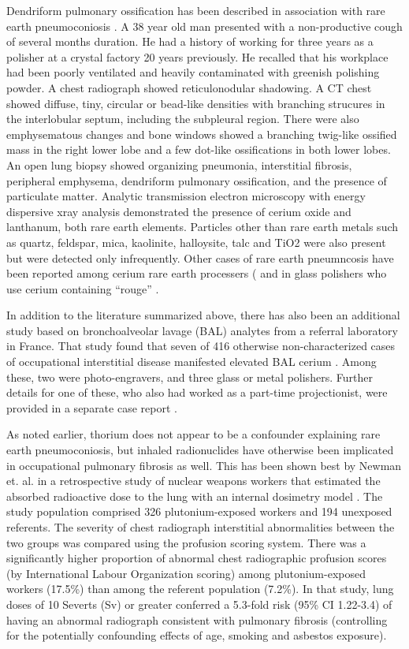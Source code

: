 \documentclass[a4
er,12pt]{article}
\begin{document}
Dendriform pulmonary ossification has been described in association with rare earth pneumoconiosis \cite{Yoon2005}. A 38 year old man presented with a non-productive cough of several months duration. He had a history of working for three years as a polisher at a crystal factory 20 years previously. He recalled that his workplace had been poorly ventilated and heavily contaminated with greenish polishing powder. A chest radiograph showed reticulonodular shadowing. A CT chest showed diffuse, tiny, circular or bead-like densities with branching strucures in the interlobular septum, including the subpleural region. There were also emphysematous changes and bone windows showed a branching twig-like ossified mass in the right lower lobe and a few dot-like ossifications in both lower lobes. An open lung biopsy showed organizing pneumonia, interstitial fibrosis, peripheral emphysema, dendriform pulmonary ossification, and the presence of particulate matter. Analytic transmission electron microscopy with energy dispersive xray analysis demonstrated the presence of cerium oxide and lanthanum, both rare earth elements. Particles other than rare earth metals such as quartz, feldspar, mica, kaolinite, halloysite, talc and TiO2 were also present but were detected only infrequently. Other cases of rare earth pneumncosis have been reported among cerium rare earth processers (\cite{Husain1980,Nappee1972} and in glass polishers who use cerium containing “rouge” \cite{le1979raguenaud}. 

In addition to the literature summarized above, there has also been an additional study based on bronchoalveolar lavage (BAL) analytes from a referral laboratory in France. That study found that seven of 416 otherwise non-characterized cases of occupational interstitial disease manifested elevated BAL cerium \cite{Pairon1994}. Among these, two were photo-engravers, and three glass or metal polishers. Further details for one of these, who also had worked as a part-time projectionist, were provided in a separate case report \cite{Pairon1995,Husain1980}.

As noted earlier, thorium does not appear to be a confounder explaining rare earth pneumoconiosis, but inhaled radionuclides have otherwise been implicated in occupational pulmonary fibrosis as well. This has been shown best by Newman et. al. in a retrospective study of nuclear weapons workers that  estimated the absorbed radioactive dose to the lung with an internal dosimetry model \cite{Newman2005}. The study population comprised 326 plutonium-exposed workers and 194 unexposed referents. The severity of chest radiograph interstitial abnormalities between the two groups was compared using the profusion scoring system. There was a significantly higher proportion of abnormal chest radiographic profusion scores (by International Labour Organization scoring) among plutonium-exposed workers (17.5\%) than among the referent population (7.2\%). In that study, lung doses of 10 Severts (Sv) or greater conferred a 5.3-fold risk (95\% CI 1.22-3.4) of having an abnormal radiograph consistent with pulmonary fibrosis (controlling for the potentially confounding effects of age, smoking and asbestos exposure).
\end{document}
